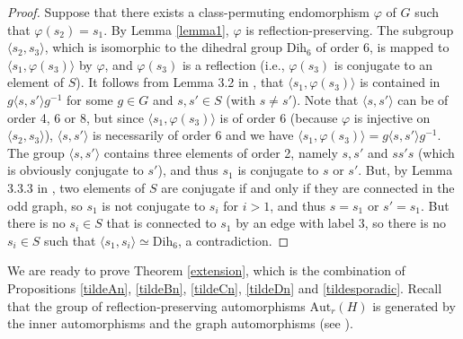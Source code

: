 \documentclass[a4paper, 11pt]{amsart}
\theoremstyle{definition}
\theoremstyle{remark}
\begin{document}
\begin{proof}
Suppose that there exists a class-permuting endomorphism $\varphi$ of $G$ such that $\varphi(s_2)=s_1$. By Lemma \ref{lemma1}, $\varphi$ is reflection-preserving. The subgroup $\langle s_2,s_3\rangle$, which is isomorphic to the dihedral group $\mathrm{Dih}_6$ of order $6$, is mapped to $\langle s_1, \varphi(s_3)\rangle$ by $\varphi$, and $\varphi(s_3)$ is a reflection (i.e., $\varphi(s_3)$ is conjugate to an element of $S$). It follows from Lemma 3.2 in \cite{CM13}, that $\langle s_1, \varphi(s_3)\rangle$ is contained in $g\langle s,s'\rangle g^{-1}$ for some $g\in G$ and $s,s'\in S$ (with $s\neq s'$). Note that $\langle s,s'\rangle$ can be of order 4, 6 or 8, but since $\langle s_1, \varphi(s_3)\rangle$ is of order 6 (because $\varphi$ is injective on $\langle s_2,s_3\rangle$), $\langle s,s'\rangle$ is necessarily of order 6 and we have $\langle s_1, \varphi(s_3)\rangle=g\langle s,s'\rangle g^{-1}$. The group $\langle s,s'\rangle$ contains three elements of order 2, namely $s,s'$ and $ss's$ (which is obviously conjugate to $s'$), and thus $s_1$ is conjugate to $s$ or $s'$. But, by Lemma 3.3.3 in \cite{davis}, two elements of $S$ are conjugate if and only if they are connected in the odd graph, so $s_1$ is not conjugate to $s_i$ for $i>1$, and thus $s=s_1$ or $s'=s_1$. But there is no $s_i\in S$ that is connected to $s_1$ by an edge with label $3$, so there is no $s_i\in S$ such that $\langle s_1,s_i\rangle\simeq \mathrm{Dih}_6$, a contradiction.   
\end{proof}

We are ready to prove Theorem \ref{extension}, which is the combination of Propositions \ref{tildeAn}, \ref{tildeBn}, \ref{tildeCn}, \ref{tildeDn} and \ref{tildesporadic}. Recall that the group of reflection-preserving automorphisms $\mathrm{Aut}_r(H)$ is generated by the inner automorphisms and the graph automorphisms (see \cite{franz}). 



\end{document}
